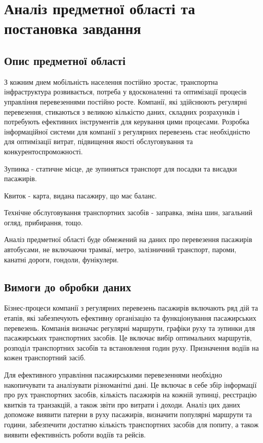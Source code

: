 \documentclass[oneside,14pt]{extarticle}
\begin{document}
\section{Аналіз предметної області та постановка завдання}
\subsection{Опис предметної області}
З кожним днем мобільність населення постійно зростає, транспортна інфраструктура розвивається, потреба у вдосконаленні та оптимізації процесів управління перевезеннями постійно росте. Компанії, які здійснюють регулярні перевезення, стикаються з великою кількістю даних, складних розрахунків і потребують ефективних інструментів для керування цими процесами. Розробка інформаційної системи для компанії з регулярних перевезень стає необхідністю для оптимізації витрат, підвищення якості обслуговування та конкурентоспроможності.

\begin{list}{-}{Специфікація важливих понять:}
\item Зупинка - статичне місце, де зупиняться транспорт для посадки та висадки пасажирів.
\item Квиток - карта, видана пасажиру, що має баланс.
\item Технічне обслуговування транспортних засобів - заправка, зміна шин, загальний огляд, прибирання, тощо.
\end{list}

Аналіз предметної області буде обмежений на даних про перевезення пасажирів автобусами, не включаючи трамваї, метро, залізничний транспорт, пароми, канатні дороги, гондоли, фунікулери.

\subsection{Вимоги до обробки даних}
Бізнес-процеси компанії з регулярних перевезень пасажирів включають ряд дій та етапів, які забезпечують ефективну організацію та функціонування пасажирських перевезень. Компанія визначає регулярні маршрути, графіки руху та зупинки для пасажирських транспортних засобів. Це включає вибір оптимальних маршрутів, розподіл транспортних засобів та встановлення годин руху. Призначення водіїв на кожен транспортний засіб.

Для ефективного управління пасажирськими перевезеннями необхідно накопичувати та аналізувати різноманітні дані. Це включає в себе збір інформації про рух транспортних засобів, кількість пасажирів на кожній зупинці, реєстрацію квитків та транзакцій, а також звіти про витрати і доходи. Аналіз цих даних допоможе виявити патерни в руху пасажирів, визначити популярні маршрути та години, забезпечити достатню кількість транспортних засобів для попиту, а також виявити ефективність роботи водіїв та рейсів.
\end{document}
